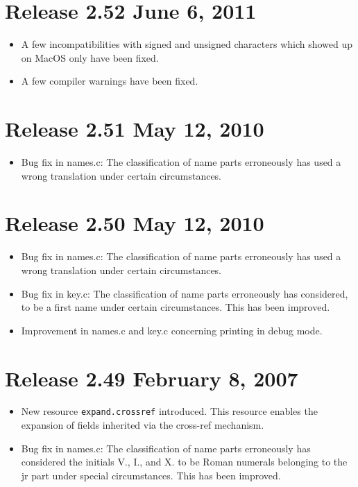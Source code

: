 \documentclass[11pt,a4paper]{scrartcl}
\newcommand\rsc[1]{\texttt{#1}}
\newcommand\File[1]{\textsf{#1}}
\newenvironment{Release}[2]{%
  \def\tmp{#2}%
  \section*{Release #1 \ifx\tmp\empty\else{\normalsize[#2]}\fi}
  \begin{itemize}
}{\end{itemize}}
\newenvironment{Fix}[1]{\item }{}
\newenvironment{New}[1]{\item }{}
\begin{document}
\begin{multicols}
 \begin{Release}{2.52}{June 6, 2011}
  \begin{Fix}{gene}
    A few incompatibilities with signed and unsigned characters which
    showed up on MacOS only have been fixed.
  \end{Fix}
  \begin{Fix}{gene}
    A few compiler warnings have been fixed.
  \end{Fix}
 \end{Release}

 \begin{Release}{2.51}{May 12, 2010}
  \begin{Fix}{gene}
    Bug fix in \File{names.c}: The classification of name parts
    erroneously has used a wrong translation under certain circumstances.
  \end{Fix}
 \end{Release}

 \begin{Release}{2.50}{May 12, 2010}
  \begin{Fix}{gene}
    Bug fix in \File{names.c}: The classification of name parts
    erroneously has used a wrong translation under certain
    circumstances.
  \end{Fix}
  \begin{Fix}{gene}
    Bug fix in \File{key.c}: The classification of name parts
    erroneously has considered, to be a first name under certain
    circumstances. This has been improved.
  \end{Fix}
  \begin{Fix}{gene}
    Improvement in \File{names.c} and \File{key.c} concerning printing in
    debug mode.
  \end{Fix}
 \end{Release}

 \begin{Release}{2.49}{February 8, 2007}
  \begin{New}{gene}
    New resource \rsc{expand.crossref} introduced. This resource
    enables the expansion of fields inherited via the cross-ref
    mechanism.
  \end{New}
  \begin{Fix}{gene}
    Bug fix in \File{names.c}: The classification of name parts
    erroneously has considered the initials V., I., and X. to be Roman
    numerals belonging to the jr part under special circumstances.
    This has been improved.
  \end{Fix}


\end{Release}
\end{multicols}
\end{document}
